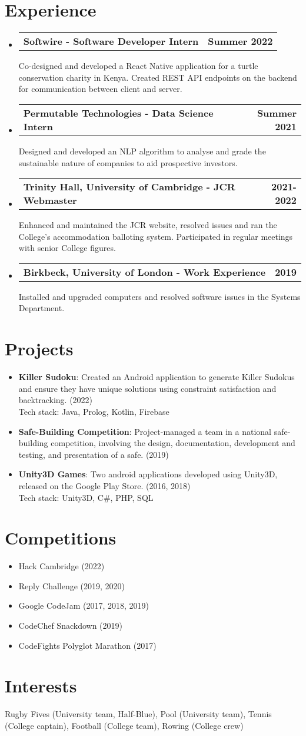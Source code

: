 \documentclass[a4paper,20pt]{article}
\makeatletter
\newcommand{\resumeItem}[2]{
  \item\small{
    \textbf{#1}{: #2 \vspace{-2pt}}
  }
}
\newcommand{\resumeSubheadingSingleLine}[2]{
  \vspace{-1pt}\item
    \begin{tabular*}{0.97\textwidth}{l@{\extracolsep{\fill}}r}
      \textbf{#1} & \textbf{#2} \\
    \end{tabular*}
}
\newcommand{\resumeSubItem}[2]{\resumeItem{#1}{#2}\vspace{-3pt}}
\newcommand{\resumeSubHeadingListStart}{\begin{itemize}[leftmargin=*]}
\newcommand{\resumeSubHeadingListEnd}{\end{itemize}}
\makeatother
\begin{document}
\section{\textbf{Experience}}
  \resumeSubHeadingListStart
    \resumeSubheadingSingleLine{Softwire - Software Developer Intern}{Summer 2022}
    {\small Co-designed and developed a React Native application for a turtle conservation charity in Kenya. Created REST API endpoints on the backend for communication between client and server.}
    \resumeSubheadingSingleLine{Permutable Technologies - Data Science Intern}{Summer 2021}
    {\small Designed and developed an NLP algorithm to analyse and grade the sustainable nature of companies to aid prospective investors.}
    \resumeSubheadingSingleLine{Trinity Hall, University of Cambridge - JCR Webmaster}{2021-2022}
    {\small Enhanced and maintained the JCR website, resolved issues and ran the College's accommodation balloting system. Participated in regular meetings with senior College figures.}
    \resumeSubheadingSingleLine{Birkbeck, University of London - Work Experience}{2019}
    {\small Installed and upgraded computers and resolved software issues in the Systems Department.}
\resumeSubHeadingListEnd

\vspace{-5pt}
\section{\textbf{Projects}}
\resumeSubHeadingListStart
\resumeItem{Killer Sudoku}
{Created an Android application to generate Killer Sudokus and ensure they have unique solutions using constraint satisfaction and backtracking. (2022) \\ Tech stack: Java, Prolog, Kotlin, Firebase}
\resumeSubItem{Safe-Building Competition}{Project-managed a team in a national safe-building competition, involving the design, documentation, development and testing, and presentation of a safe. (2019)}
\resumeSubItem{Unity3D Games}{Two android applications developed using Unity3D, released on the Google Play Store. (2016, 2018) \\ Tech stack: Unity3D, C\#, PHP, SQL}

\resumeSubHeadingListEnd
\vspace{-5pt}
\section{\textbf{Competitions}}
\resumeSubHeadingListStart
    \item\small Hack Cambridge (2022) \vspace{-5pt}
    \item\small Reply Challenge (2019, 2020) \vspace{-5pt}
    \item\small Google CodeJam (2017, 2018, 2019) \vspace{-5pt}
    \item\small CodeChef Snackdown (2019) \vspace{-5pt}
    \item\small CodeFights Polyglot Marathon (2017)
\resumeSubHeadingListEnd
\section{\textbf{Interests}}
\small Rugby Fives (University team, Half-Blue), Pool (University team), Tennis (College captain), Football (College team), Rowing (College crew)
\end{document}
